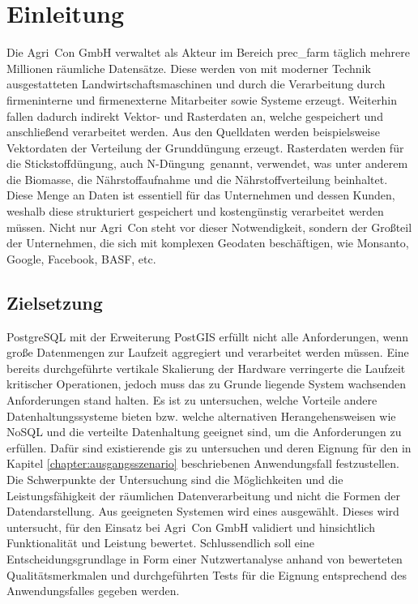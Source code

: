 \chapter{Einleitung}
Die Agri~Con GmbH verwaltet als Akteur im Bereich \Gls{prec_farm} täglich mehrere Millionen räumliche Datensätze.
Diese werden von mit moderner Technik ausgestatteten Landwirtschaftsmaschinen und durch die Verarbeitung durch firmeninterne und firmenexterne Mitarbeiter sowie Systeme erzeugt.
Weiterhin fallen dadurch indirekt Vektor- und Rasterdaten an, welche gespeichert und anschließend verarbeitet werden.
Aus den Quelldaten werden beispielsweise Vektordaten der Verteilung der Grunddüngung erzeugt.
Rasterdaten werden für die Stickstoffdüngung, auch \glqq N-Düngung\grqq\ genannt, verwendet, was unter anderem die Biomasse, die Nährstoffaufnahme und die Nährstoffverteilung beinhaltet.
Diese Menge an Daten ist essentiell für das Unternehmen und dessen Kunden, weshalb diese strukturiert gespeichert und kostengünstig verarbeitet werden müssen.
Nicht nur Agri~Con steht vor dieser Notwendigkeit, sondern der Großteil der Unternehmen, die sich mit komplexen Geodaten beschäftigen, wie Monsanto, Google, Facebook, BASF, etc.


\section{Zielsetzung}
PostgreSQL mit der Erweiterung PostGIS erfüllt nicht alle Anforderungen, wenn große Datenmengen zur Laufzeit aggregiert und verarbeitet werden müssen. %
Eine bereits durchgeführte vertikale Skalierung der Hardware verringerte die Laufzeit kritischer Operationen, jedoch muss das zu Grunde liegende System wachsenden Anforderungen stand halten.
Es ist zu untersuchen, welche Vorteile andere Datenhaltungssysteme bieten bzw. welche alternativen Herangehensweisen wie NoSQL und die verteilte Datenhaltung geeignet sind, um die Anforderungen zu erfüllen. %
Dafür sind existierende \Gls{gis} zu untersuchen und deren Eignung für den in Kapitel \ref{chapter:ausgangsszenario} beschriebenen Anwendungsfall festzustellen.
Die Schwerpunkte der Untersuchung sind die Möglichkeiten und die Leistungsfähigkeit der räumlichen Datenverarbeitung und nicht die Formen der Datendarstellung.
Aus geeigneten Systemen wird eines ausgewählt.
Dieses wird untersucht, für den Einsatz bei Agri~Con GmbH validiert und hinsichtlich Funktionalität und Leistung bewertet.
Schlussendlich soll eine Entscheidungsgrundlage in Form einer Nutzwertanalyse anhand von bewerteten Qualitätsmerkmalen und durchgeführten Tests für die Eignung entsprechend des Anwendungsfalles gegeben werden.

